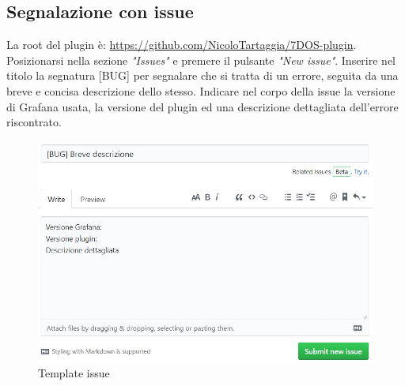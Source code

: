 \subsection{Segnalazione con issue}
La root del plugin è: \url{https://github.com/NicoloTartaggia/7DOS-plugin}. \\
Posizionarsi nella sezione \emph{"Issues"} e premere il pulsante \emph{"New issue"}. Inserire nel titolo la segnatura [BUG] per segnalare che si tratta di un errore, seguita da una breve e concisa descrizione dello stesso.
Indicare nel corpo della issue la versione di Grafana usata, la versione del plugin ed una descrizione dettagliata dell'errore riscontrato.
\begin{figure} [H]
	\centering
	\includegraphics[scale=0.9]{Img/issue.jpg} 
	\caption{Template issue} \label{} 
\end{figure} 

\newpage